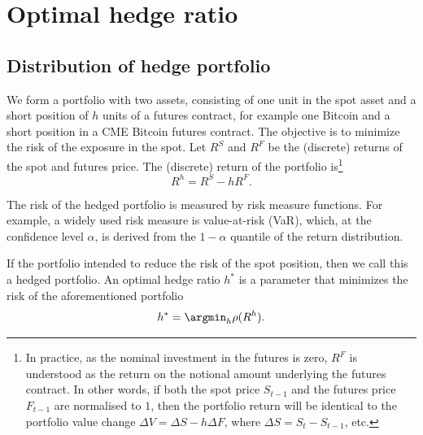 \section{Optimal hedge ratio}\label{sec:optimal-hedge-ratio}

\subsection{Distribution of hedge portfolio}\label{subsec:DHP}
We form a portfolio with two assets, consisting of one unit in the
spot asset and a short position of $h$ units of a futures contract,
for example one Bitcoin and a short position in a CME Bitcoin
futures contract. 
The objective is to minimize the risk of the exposure in the spot. 
Let $R^S$ and $R^F$ be the (discrete) returns of the spot and
futures price. The (discrete) return of the portfolio is\footnote{%
In practice, as the nominal investment in the futures is zero, $R^F$
is understood as the return on the notional amount underlying the
futures contract. In other words, if both the spot price $S_{t-1}$
and the futures price $F_{t-1}$ are 
normalised to $1$, then the portfolio return will be identical to the
portfolio value change $\Delta V = \Delta S - h \Delta F$, where $\Delta S =
S_t-S_{t-1}$, etc.}
\begin{equation*}
R^h = R^S -h R^F.
\end{equation*}

The risk of the hedged portfolio is measured by risk measure functions.
For example, a widely used risk measure is value-at-risk (VaR), which,
at the confidence level $\alpha$,
is derived from the $1-\alpha$ quantile of the return distribution. %

If the portfolio intended to reduce the risk of the spot position, then
we call this a hedged portfolio.
An optimal hedge ratio $h^*$ is a parameter that
minimizes the risk of the aforementioned portfolio
\begin{equation*}
h^* = \argmin_h \rho(R^h).
\end{equation*}

